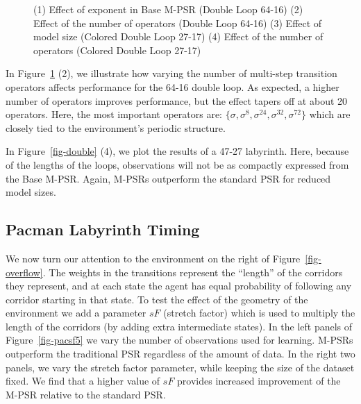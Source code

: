 \documentclass[letterpaper]{article}
\begin{document}
\begin{figure}[t!]
\caption{(1) Effect of exponent in Base M-PSR (Double Loop 64-16) (2) Effect of the number of operators (Double Loop 64-16) (3) Effect of model size (Colored Double Loop 27-17) (4) Effect of the number of operators (Colored Double Loop 27-17)\label{fig-colnumops}%
}
\end{figure}

In Figure~\ref{fig-colnumops} (2), we illustrate how varying the number of multi-step transition operators affects performance for the 64-16 double loop. As expected, a higher number of operators improves performance, but the effect tapers off at about 20 operators. Here, the most important operators are: $\{\sigma,\sigma^{8},\sigma^{24},\sigma^{32},\sigma^{72}\}$ which are closely tied to the environment's periodic structure.


In Figure~\ref{fig-double} (4), we plot the results of a 47-27 labyrinth.  Here, because of the lengths of the loops, observations will not be as compactly expressed from the Base M-PSR. Again, M-PSRs outperform the standard PSR for reduced model sizes.

\subsection{Pacman Labyrinth Timing}

We now turn our attention to the environment on the right of Figure~\ref{fig-overflow}. The weights in the transitions represent the ``length'' of the corridors they represent, and at each state the agent has equal probability of following any corridor starting in that state. To test the effect of the geometry of the environment we add a parameter $sF$ (stretch factor) which is used to multiply the length of the corridors (by adding extra intermediate states). In the left panels of Figure~\ref{fig-pacsf5} we vary the number of observations used for learning. M-PSRs outperform the traditional PSR regardless of the amount of data. In the right two panels, we vary the stretch factor parameter, while  keeping the size of the dataset fixed. We find that a higher value of $sF$ provides increased improvement of the M-PSR relative to the standard PSR.
\end{document}
